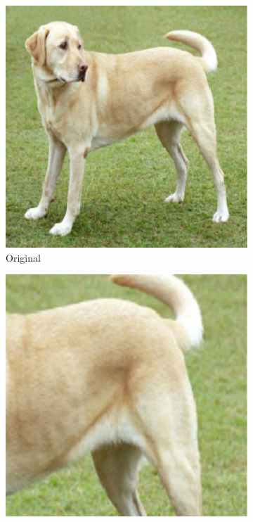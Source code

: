 \begin{figure}[th]
\centering
\begin{subfigure}{.19\textwidth}
  \centering
  \includegraphics[width=0.9\linewidth]{chapters/assets/ssl_figs/transforms/img_original.pdf}
  \caption{Original}
\end{subfigure}\begin{subfigure}{.19\textwidth}
  \centering
  \includegraphics[width=0.9\linewidth]{chapters/assets/ssl_figs/transforms/img_crop1.pdf}

\end{subfigure}
\end{figure}
